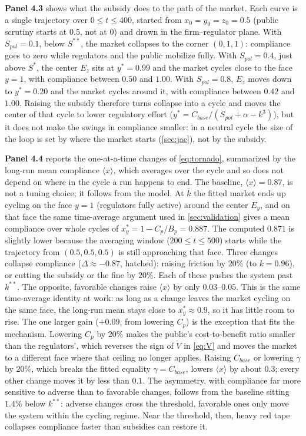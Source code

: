 \documentclass[10pt]{article}
\newcommand{\kbar}{\bar{k}}
\begin{document}
\textbf{Panel 4.3} shows what the subsidy does to the path of the market. Each curve is a single trajectory over $0\le t\le400$, started from $x_0=y_0=z_0=0.5$ (public scrutiny starts at $0.5$, not at $0$) and drawn in the firm--regulator plane. With $S_{pol}=0.1$, below $S^{**}$, the market collapses to the corner $(0,1,1)$: compliance goes to zero while regulators and the public mobilize fully. With $S_{pol}=0.4$, just above $S^*$, the center $E_z$ sits at $y^*=0.99$ and the market cycles close to the face $y=1$, with compliance between $0.50$ and $1.00$. With $S_{pol}=0.8$, $E_z$ moves down to $y^*=0.20$ and the market cycles around it, with compliance between $0.42$ and $1.00$. Raising the subsidy therefore turns collapse into a cycle and moves the center of that cycle to lower regulatory effort ($y^*=C_{base}/(S_{pol}+\alpha-k^3)$), but it does not make the swings in compliance smaller: in a neutral cycle the size of the loop is set by where the market starts (\cref{sec:jac}), not by the subsidy.

\textbf{Panel 4.4} reports the one-at-a-time changes of \cref{eq:tornado}, summarized by the long-run mean compliance $\langle x\rangle$, which averages over the cycle and so does not depend on where in the cycle a run happens to end. The baseline, $\langle x\rangle=0.87$, is not a tuning choice; it follows from the model. At $\kbar$ the fitted market ends up cycling on the face $y=1$ (regulators fully active) around the center $E_y$, and on that face the same time-average argument used in \cref{sec:validation} gives a mean compliance over whole cycles of $x_y^*=1-C_p/B_p=0.887$. The computed $0.871$ is slightly lower because the averaging window ($200\le t\le500$) starts while the trajectory from $(0.5,0.5,0.5)$ is still approaching that face. Three changes collapse compliance ($\Delta\approx-0.87$, hatched): raising friction by $20\%$ (to $k=0.96$), or cutting the subsidy or the fine by $20\%$. Each of these pushes the system past $k^{**}$. The opposite, favorable changes raise $\langle x\rangle$ by only $0.03$--$0.05$. This is the same time-average identity at work: as long as a change leaves the market cycling on the same face, the long-run mean stays close to $x_y^*\approx0.9$, so it has little room to rise. The one larger gain ($+0.09$, from lowering $C_p$) is the exception that fits the mechanism. Lowering $C_p$ by $20\%$ makes the public's cost-to-benefit ratio smaller than the regulators', which reverses the sign of $\dot V$ in \cref{eq:V} and moves the market to a different face where that ceiling no longer applies. Raising $C_{base}$ or lowering $\gamma$ by $20\%$, which breaks the fitted equality $\gamma=C_{base}$, lowers $\langle x\rangle$ by about $0.3$; every other change moves it by less than $0.1$. The asymmetry, with compliance far more sensitive to adverse than to favorable changes, follows from the baseline sitting $1.4\%$ below $k^{**}$: adverse changes cross the threshold, favorable ones only move the system within the cycling regime. Near the threshold, then, heavy red tape collapses compliance faster than subsidies can restore it.
\end{document}

